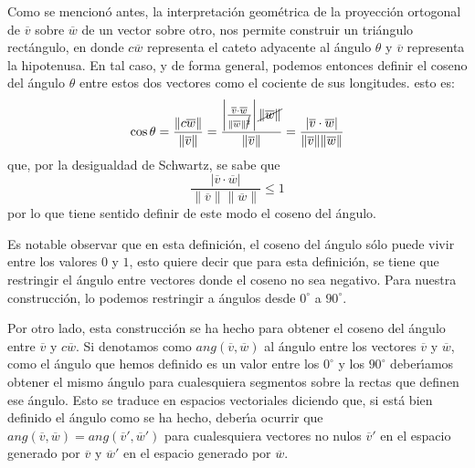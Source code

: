 \documentclass[a4paper,11pt]{article}
\theoremstyle{teoremas}
\theoremstyle{ejemplos}
\theoremstyle{definiciones}
\theoremstyle{lemas}
\begin{document}
Como se mencion\'o antes, la interpretaci\'on geom\'etrica de la proyecci\'on ortogonal de $\overline{v}$ sobre $\overline{w}$ de un vector sobre otro, nos permite construir un tri\'angulo rect\'angulo, en donde $c\overline{w}$ representa el cateto adyacente al \'angulo $\theta$ y $\overline{v}$ representa la hipotenusa. En tal caso, y de forma general, podemos entonces definir el coseno del \'angulo $\theta$ entre estos dos vectores como el cociente de sus longitudes. esto es:
\begin{equation}
 \cos \theta = \frac{\lVert c\overline{w} \rVert }{\lVert \overline{v} \rVert} 
 = \frac{ \left\lvert \frac{\overline{v}\cdot \overline{w}}{ \lVert \overline{w} \rVert^{\cancel{2}}} \right\rvert \cancel{\lVert\overline{w}\rVert}}{\lVert \overline{v} \rVert} 
 = \frac{\lvert \overline{v}\cdot \overline{w} \rvert}{\lVert \overline{v} \rVert \lVert \overline{w} \rVert}
\end{equation}
que, por la desigualdad de Schwartz, se sabe que
\begin{equation*}
 \frac{\lvert \overline{v} \cdot \overline{w} \rvert}{\lVert \overline{v} \rVert \lVert \overline{w} \rVert} \leq 1
\end{equation*}
por lo que tiene sentido definir de este modo el coseno del \'angulo.
\par 
Es notable observar que en esta definici\'on, el coseno del \'angulo s\'olo puede vivir entre los valores $0$ y $1$, esto quiere decir que para esta definici\'on, se tiene que restringir el \'angulo entre vectores donde el coseno no sea negativo. Para nuestra construcci\'on, lo podemos restringir a \'angulos desde $0^{\circ}$ a $90^{\circ}$.
\par 
Por otro lado, esta construcci\'on se ha hecho para obtener el coseno del \'angulo entre $\overline{v}$ y $c\overline{w}$. Si denotamos como $ang\left(\overline{v}, \overline{w}\right)$ al \'angulo entre los vectores $\overline{v}$ y $\overline{w}$, como el \'angulo que hemos definido es un valor entre los $0^{\circ}$ y los $90^{\circ}$ deber\'{\i}amos obtener el mismo \'angulo para cualesquiera segmentos sobre la rectas que definen ese \'angulo. Esto se traduce en espacios vectoriales diciendo que, si est\'a bien definido el \'angulo como se ha hecho, deber\'{\i}a ocurrir que $ang(\overline{v}, \overline{w}) = ang(\overline{v}', \overline{w}')$ para cualesquiera vectores no nulos $\overline{v}'$ en el espacio generado por $\overline{v}$ y $\overline{w}'$ en el espacio generado por $\overline{w}$.
\par 
\end{document}
